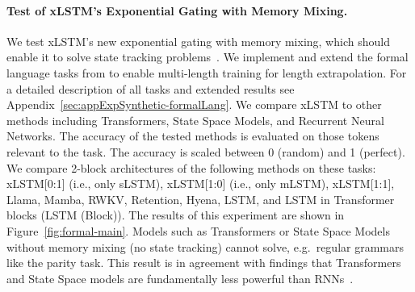 \documentclass[dvipsnames]{article}
\begin{document}
\paragraph{Test of xLSTM's Exponential Gating with Memory Mixing.}
We test xLSTM's new exponential gating with memory mixing,
which should enable it to solve state tracking problems~\citep{Merrill:24, Merrill:23}.
We implement and extend the formal language tasks from \citet{Deletang:23}
to enable multi-length training for length extrapolation.
For a detailed description of all tasks and extended results see
Appendix~\ref{sec:appExpSynthetic-formalLang}.
We compare xLSTM to other methods including Transformers, State Space Models,
and Recurrent Neural Networks.
The accuracy of the tested methods is evaluated
on those tokens relevant to the task.
The accuracy is scaled between 0 (random) and 1 (perfect).
We compare 2-block architectures of the following methods on these tasks:
xLSTM[0:1] (i.e., only sLSTM),
xLSTM[1:0] (i.e., only mLSTM),
xLSTM[1:1],
Llama,
Mamba,
RWKV,
Retention,
Hyena,
LSTM, and
LSTM in Transformer blocks (LSTM (Block)).
The results of this experiment are shown in Figure~\ref{fig:formal-main}.
Models such as Transformers or State Space Models without memory mixing (no state tracking)
cannot solve, e.g.\ regular grammars like the parity task.
This result is in agreement with findings that
Transformers and State Space models are fundamentally
less powerful than RNNs~\citep{Merrill:24, Merrill:23, Deletang:23}.
\end{document}
